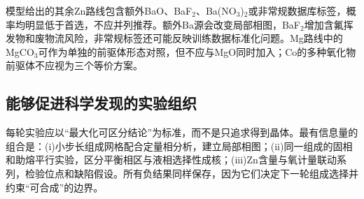 模型给出的其余Zn路线包含额外BaO、BaF$_2$、Ba(NO$_3$)$_2$或非常规数据库标签，概率均明显低于首选，不应并列推荐。额外Ba源会改变局部相图，BaF$_2$增加含氟挥发物和废物流风险，非常规标签还可能反映训练数据标准化问题。Mg路线中的MgCO$_3$可作为单独的前驱体形态对照，但不应与MgO同时加入；Co的多种氧化物前驱体不应视为三个等价方案。

\subsection{能够促进科学发现的实验组织}

每轮实验应以“最大化可区分结论”为标准，而不是只追求得到晶体。最有信息量的组合是：(i)小步长组成网格配合定量相分析，建立局部相图；(ii)同一组成的固相和助熔平行实验，区分平衡相区与液相选择性成核；(iii)Zn含量与氧计量联动系列，检验位点和缺陷假设。所有负结果同样保存，因为它们决定下一轮组成选择并约束“可合成”的边界。
